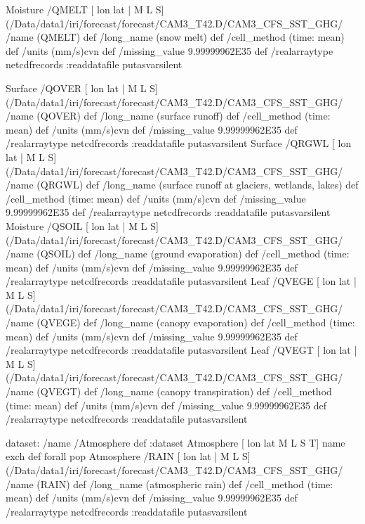 \begin{ingrid}
Moisture /QMELT{
[ lon lat | M L S] (/Data/data1/iri/forecast/forecast/CAM3_T42.D/CAM3_CFS_SST_GHG/%
/name (QMELT) def
 /long_name (snow melt) def
 /cell_method (time: mean) def
 /units (mm/s)cvn def
 /missing_value 9.99999962E35 def
 /realarraytype netcdfrecords :readdatafile
}putasvarsilent

Surface /QOVER{
[ lon lat | M L S] (/Data/data1/iri/forecast/forecast/CAM3_T42.D/CAM3_CFS_SST_GHG/%
/name (QOVER) def
 /long_name (surface runoff) def
 /cell_method (time: mean) def
 /units (mm/s)cvn def
 /missing_value 9.99999962E35 def
 /realarraytype netcdfrecords :readdatafile
}putasvarsilent
Surface /QRGWL{
[ lon lat | M L S] (/Data/data1/iri/forecast/forecast/CAM3_T42.D/CAM3_CFS_SST_GHG/%
/name (QRGWL) def
 /long_name (surface runoff at glaciers, wetlands, lakes) def
 /cell_method (time: mean) def
 /units (mm/s)cvn def
 /missing_value 9.99999962E35 def
 /realarraytype netcdfrecords :readdatafile
}putasvarsilent
Moisture /QSOIL{
[ lon lat | M L S] (/Data/data1/iri/forecast/forecast/CAM3_T42.D/CAM3_CFS_SST_GHG/%
/name (QSOIL) def
 /long_name (ground evaporation) def
 /cell_method (time: mean) def
 /units (mm/s)cvn def
 /missing_value 9.99999962E35 def
 /realarraytype netcdfrecords :readdatafile
}putasvarsilent
Leaf /QVEGE{
[ lon lat | M L S] (/Data/data1/iri/forecast/forecast/CAM3_T42.D/CAM3_CFS_SST_GHG/%
/name (QVEGE) def
 /long_name (canopy evaporation) def
 /cell_method (time: mean) def
 /units (mm/s)cvn def
 /missing_value 9.99999962E35 def
 /realarraytype netcdfrecords :readdatafile
}putasvarsilent
Leaf /QVEGT{
[ lon lat | M L S] (/Data/data1/iri/forecast/forecast/CAM3_T42.D/CAM3_CFS_SST_GHG/%
/name (QVEGT) def
 /long_name (canopy transpiration) def
 /cell_method (time: mean) def
 /units (mm/s)cvn def
 /missing_value 9.99999962E35 def
 /realarraytype netcdfrecords :readdatafile
}putasvarsilent

dataset: /name /Atmosphere def :dataset
Atmosphere [ lon lat M L S T] {name exch def} forall pop
Atmosphere /RAIN{
[ lon lat | M L S] (/Data/data1/iri/forecast/forecast/CAM3_T42.D/CAM3_CFS_SST_GHG/%
/name (RAIN) def
 /long_name (atmospheric rain) def
 /cell_method (time: mean) def
 /units (mm/s)cvn def
 /missing_value 9.99999962E35 def
 /realarraytype netcdfrecords :readdatafile
}putasvarsilent


\end{ingrid}
